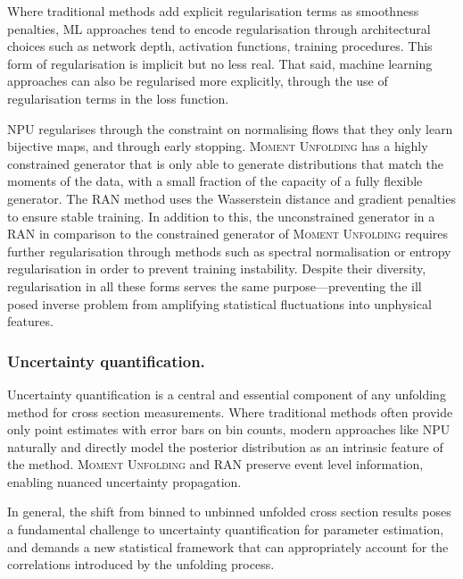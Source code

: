         Where traditional methods add explicit regularisation terms as smoothness penalties, ML approaches tend to encode regularisation through architectural choices such as network depth, activation functions, training procedures.
        This form of regularisation is implicit but no less real.
        That said, machine learning approaches can also be regularised more explicitly, through the use of regularisation terms in the loss function.
        
        NPU regularises through the constraint on normalising flows that they only learn bijective maps, and through early stopping.
        \textsc{Moment Unfolding} has a highly constrained generator that is only able to generate distributions that match the moments of the data, with a small fraction of the capacity of a fully flexible generator.
        The RAN method uses the Wasserstein distance and gradient penalties to ensure stable training.
        In addition to this, the unconstrained generator in a RAN in comparison to the constrained generator of \textsc{Moment Unfolding} requires further regularisation through methods such as spectral normalisation or entropy regularisation in order to prevent training instability.
        Despite their diversity, regularisation in all these forms serves the same purpose---preventing the ill posed inverse problem from amplifying statistical fluctuations into unphysical features.

        \subsubsection{Uncertainty quantification.}
        Uncertainty quantification is a central and essential component of any unfolding method for cross section measurements.
        Where traditional methods often provide only point estimates with error bars on bin counts, modern approaches like NPU naturally and directly model the posterior distribution as an intrinsic feature of the method.
        \textsc{Moment Unfolding} and RAN preserve event level information, enabling nuanced uncertainty propagation.
        
        In general, the shift from binned to unbinned unfolded cross section results poses a fundamental challenge to uncertainty quantification for parameter estimation, and demands a new statistical framework that can appropriately account for the correlations introduced by the unfolding process.

